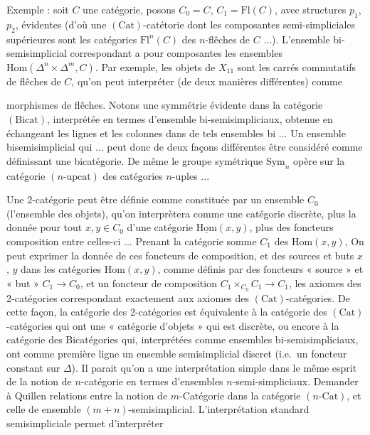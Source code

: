 \documentclass[11pt,a4paper]{article}
\begin{document}
Exemple : soit $C$ une catégorie, posons $C_{0} = C$, $C_{1} =
\mathrm{Fl}(C)$, avec structures $p_{1}$, $p_{2}$, évidentes (d'où une
$(\mathrm{Cat})$-catétorie dont les composantes semi-simpliciales supérieures
sont les catégories $\mathrm{Fl}^{n}(C)$ des $n$-flêches de $C$ ...).
L'ensemble bi-semisimplicial correspondant a pour composantes les ensembles
$\mathrm{Hom}(\Delta^{n} \times \Delta^{m}, C)$. Par exemple, les objets de
$X_{11}$ sont les carrés commutatifs de flêches de $C$, qu'on peut interpréter
(de deux manières différentes) comme


morphismes de flêches. Notons une symmétrie évidente dans la catégorie
$(\mathrm{Bicat})$, interprétée en termes d'ensemble bi-semisimpliciaux,
obtenue en échangeant les lignes et les colonnes dans de tels ensembles bi
... Un ensemble bisemisimplicial qui ... peut donc de deux façons
différentes être considéré comme définissant une bicatégorie. De même le
groupe symétrique $\mathrm{Sym}_{n}$ opère sur la catégorie
$(n\text{-upcat})$ des catégories $n$-uples ...

Une 2-catégorie peut être définie comme constituée par un ensemble $C_{0}$
(l'ensemble des objets), qu'on interprètera comme une catégorie discrète, plus
la donnée pour tout $x, y \in C_{0}$ d'une catégorie
$\underline{\mathrm{Hom}}(x, y)$, plus des foncteurs composition entre celles-ci
... Prenant la catégorie somme $C_{1}$ des $\mathrm{Hom}(x, y)$, On peut
exprimer la donnée de ces foncteurs de composition, et des sources et buts
$x$, $y$ dans les catégories $\mathrm{Hom}(x, y)$, comme définis par des
foncteurs « source » et « but » $C_{1} \to C_{0}$, et un foncteur de
composition $C_{1} \times_{C_{0}} C_{1} \to C_{1}$, les axiomes des
2-catégories correspondant exactement aux axiomes des
$(\mathrm{Cat})$-catégories. De cette façon, la catégorie des 2-catégories
est équivalente à la catégorie des $(\mathrm{Cat})$-catégories qui ont une
« catégorie d'objets » qui est discrète, ou encore à la catégorie des
Bicatégories qui, interprétées comme ensembles bi-semisimpliciaux, ont comme
première ligne un ensemble semisimplicial discret (i.e.\ un foncteur constant
sur $\Delta$). Il parait qu'on a une interprétation simple dans le même
esprit de la notion de $n$-catégorie en termes d'ensembles
$n$-semi-simpliciaux. Demander à Quillen relations entre la notion de
$m$-Catégorie dans la catégorie $(n\text{-Cat})$, et celle de ensemble
$(m+n)$-semisimplicial. L'interprétation
standard semisimpliciale permet d'interpréter
\end{document}
